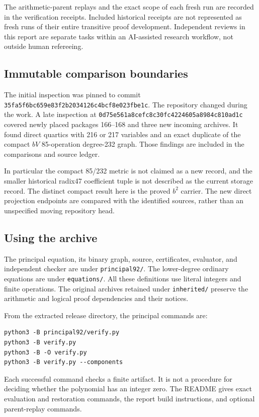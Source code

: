 \documentclass[11pt]{article}
\begin{document}
The arithmetic-parent replays and the exact scope of each fresh run
are recorded in the verification receipts. Included historical receipts
are not represented as fresh runs of their entire transitive proof
development. Independent reviews in this report are separate tasks
within an AI-assisted research workflow, not outside human refereeing.

\subsection{Immutable comparison boundaries}

The initial inspection was pinned to commit
\texttt{35fa5f6bc659e83f2b2034126c4bcf8e023fbe1c}.
The repository changed during the work. A late inspection at
\texttt{0d75e561a8cefc8c30fc4224605a8984c810ad1c}
covered newly placed packages 166--168 and three new incoming archives.
It found direct quartics with 216 or 217 variables and an exact duplicate
of the compact $bV$ 85-operation degree-232 graph. Those findings are
included in the comparisons and source ledger.

In particular the compact 85/232 metric is not claimed as a new record,
and the smaller historical radix47 coefficient tuple is not described
as the current storage record. The distinct compact result here is
the proved $b^2$ carrier. The new direct projection endpoints are
compared with the identified sources, rather than an unspecified
moving repository head.

\subsection{Using the archive}

The principal equation, its binary graph, source, certificates,
evaluator, and independent checker are under \texttt{principal92/}.
The lower-degree ordinary equations are under \texttt{equations/}.
All these definitions use literal integers and finite operations.
The original archives retained under \texttt{inherited/} preserve
the arithmetic and logical proof dependencies and their notices.

From the extracted release directory, the principal commands are:
\begin{verbatim}
python3 -B principal92/verify.py
python3 -B verify.py
python3 -B -O verify.py
python3 -B verify.py --components
\end{verbatim}
Each successful command checks a finite artifact. It is not a procedure
for deciding whether the polynomial has an integer zero. The README
gives exact evaluation and restoration commands, the report build
instructions, and optional parent-replay commands.
\end{document}
